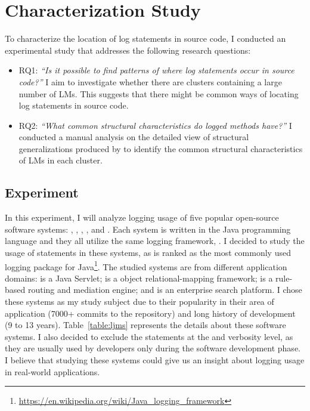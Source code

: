 \chapter{Characterization Study}\label{discover}\label{eval}

To characterize the location of log statements in source code, I conducted an experimental study that addresses the following research questions:

\begin{itemize} [leftmargin=.5in]
\item \textsc{RQ1: }\emph{``Is it possible to find patterns of where log statements occur in source code?''} I aim to investigate whether there are clusters containing a large number of LMs. This suggests that there might be common ways of locating log statements in source code.

\item \textsc{RQ2: }\emph{``What common structural characteristics do logged methods have?''} I conducted a manual analysis on the detailed view of structural generalizations produced by  to identify the common structural characteristics of LMs in each cluster.
\end{itemize}


\section{Experiment}  \label{setup-characterization}
In this experiment, I will analyze logging usage of five popular open-source software systems: , , , , and . Each system is written in the Java programming language and they all utilize the same logging framework, . I decided to study the usage of  statements in these systems, as  is ranked as the most commonly used logging package for Java\footnote{\url{https://en.wikipedia.org/wiki/Java_logging_framework}}. The studied systems are from different application domains:  is a Java Servlet;  is a object relational-mapping framework;  is a rule-based routing and mediation engine; and  is an enterprise search platform. I chose these systems as my study subject due to their popularity in their area of application (7000+ commits to the  repository) and long history of development (9 to 13 years). Table~\ref{table:ljms} represents the details about these software systems. I also decided to exclude the  statements at the  and  verbosity level, as they are usually used by developers only during the software development phase. I believe that studying these systems could give us an insight about logging usage in real-world applications.



